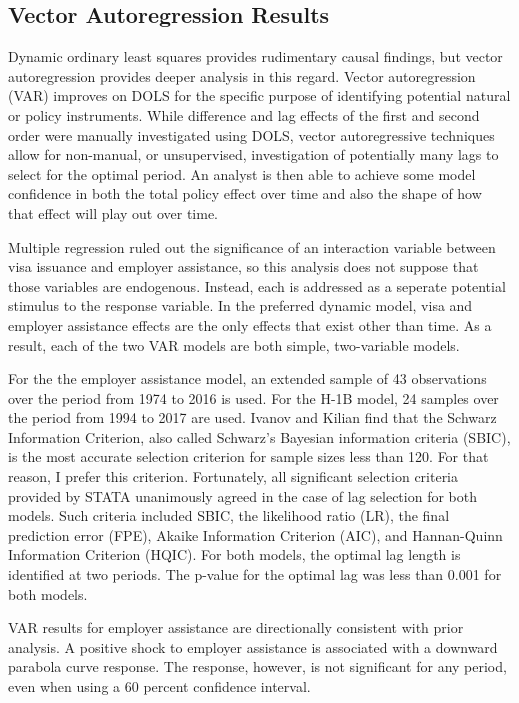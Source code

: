 \documentclass[review]{elsarticle}
\begin{document}
\subsection{Vector Autoregression Results}

Dynamic ordinary least squares provides rudimentary causal findings,
but vector autoregression provides deeper analysis in this regard.
Vector autoregression (VAR) improves on DOLS for the specific purpose
of identifying potential natural or policy instruments.
While difference and lag effects of the first and second order were manually investigated using DOLS,
vector autoregressive techniques allow for non-manual, or unsupervised,
investigation of potentially many lags to select for the optimal period.
An analyst is then able to achieve some model confidence in both the total policy effect over time
and also the shape of how that effect will play out over time.

Multiple regression ruled out the significance of an interaction variable between
visa issuance and employer assistance,
so this analysis does not suppose that those variables are endogenous.
Instead, each is addressed as a seperate potential stimulus to the response variable.
In the preferred dynamic model, visa and employer assistance effects
are the only effects that exist other than time.
As a result, each of the two VAR models are both simple, two-variable models.

For the the employer assistance model,
an extended sample of 43 observations
over the period from 1974 to 2016 is used.
For the H-1B model, 24 samples over the period from 1994 to 2017 are used.
Ivanov and Kilian find that the Schwarz Information Criterion,
also called Schwarz's Bayesian information criteria (SBIC),
is the most accurate selection criterion for sample sizes less than 120\cite{ivanov2005practitioner}.
For that reason, I prefer this criterion.
Fortunately, all significant selection criteria provided by STATA unanimously agreed in the case of lag selection for both models.
Such criteria included SBIC, the likelihood ratio (LR), the final prediction error (FPE),
Akaike Information Criterion (AIC), and Hannan-Quinn Information Criterion (HQIC).
For both models, the optimal lag length is identified at two periods.
The p-value for the optimal lag was less than 0.001 for both models.

VAR results for employer assistance are directionally consistent with prior analysis.
A positive shock to employer assistance is associated with a downward parabola curve response.
The response, however, is not significant for any period, even when using a 60 percent confidence interval.
\end{document}
